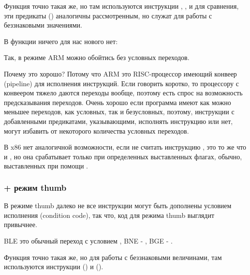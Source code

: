 Функция  точно такая же, но там используются инструкции , , 
и  для сравнения,
эти предикаты () аналогичны рассмотренным,
но служат для работы с беззнаковыми значениями.

В функции \main ничего для нас нового нет:



Так, в режиме ARM можно обойтись без условных переходов.

Почему это хорошо? Потому что ARM это RISC-процессор имеющий конвеер (pipeline) для исполнения инструкций. 
Если говорить 
коротко, то процессору с конвеером тяжело даются переходы вообще, поэтому есть спрос на возможность 
предсказывания переходов.
Очень хорошо если программа имеют как можно меньшее переходов, как условных, так и безусловных, поэтому, 
инструкции с добавленными предикатами, указывающими,
исполнять инструкцию или нет, могут избавить от некоторого количества условных переходов.

В x86 нет аналогичной возможности, если не считать инструкцию , это то же что и \MOV, но она срабатывает
только при определенных выставленных флагах, обычно, выставленных при помощи \CMP.

\subsubsection{\OptimizingKeil + режим thumb}



В режиме thumb далеко не все инструкции могут быть дополнены условием исполнения (condition code), так что,
код для режима thumb выглядит привычнее.

BLE это обычный переход с условием , BNE - , BGE - .

Функция  точно такая же, но для работы с беззнаковыми величинами, там используются 
инструкции  () и  ().

